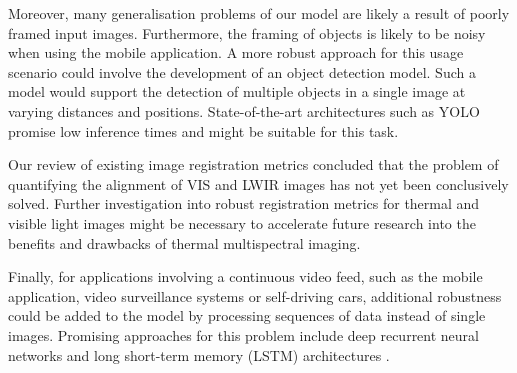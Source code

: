 \documentclass{l4proj}
\begin{document}
Moreover, many generalisation problems of our model are likely a result of poorly framed input images. Furthermore, the framing of objects is likely to be noisy when using the mobile application. A more robust approach for this usage scenario could involve the development of an object detection model. Such a model would support the detection of multiple objects in a single image at varying distances and positions. State-of-the-art architectures such as YOLO \citep{redmon_you_2016, redmon_yolov3_2018} promise low inference times and might be suitable for this task. 

Our review of existing image registration metrics concluded that the problem of quantifying the alignment of VIS and LWIR images has not yet been conclusively solved. Further investigation into robust registration metrics for thermal and visible light images might be necessary to accelerate future research into the benefits and drawbacks of thermal multispectral imaging.

Finally, for applications involving a continuous video feed, such as the mobile application, video surveillance systems or self-driving cars, additional robustness could be added to the model by processing sequences of data instead of single images. Promising approaches for this problem include deep recurrent neural networks and long short-term memory (LSTM) architectures \citep{hochreiter_long_1997}.

%
% 
\end{document}
